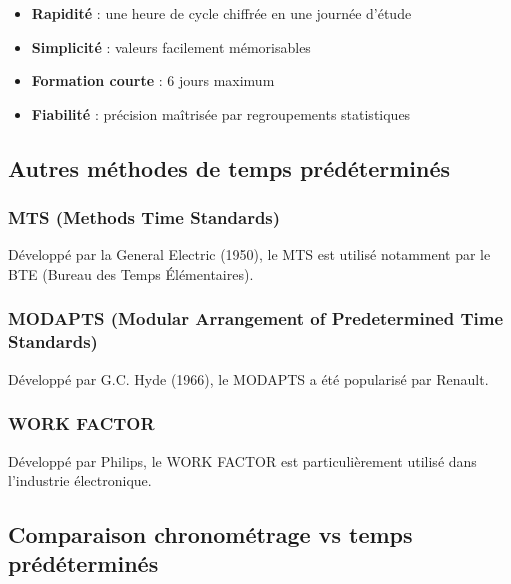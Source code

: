 \documentclass[a4paper,12pt]{article}
\begin{document}
\begin{itemize}
    \item \textbf{Rapidité} : une heure de cycle chiffrée en une journée d'étude
    \item \textbf{Simplicité} : valeurs facilement mémorisables
    \item \textbf{Formation courte} : 6 jours maximum
    \item \textbf{Fiabilité} : précision maîtrisée par regroupements statistiques
\end{itemize}

\subsection{Autres méthodes de temps prédéterminés}

\subsubsection{MTS (Methods Time Standards)}

Développé par la General Electric (1950), le MTS est utilisé notamment par le BTE (Bureau des Temps Élémentaires).

\subsubsection{MODAPTS (Modular Arrangement of Predetermined Time Standards)}

Développé par G.C. Hyde (1966), le MODAPTS a été popularisé par Renault.

\subsubsection{WORK FACTOR}

Développé par Philips, le WORK FACTOR est particulièrement utilisé dans l'industrie électronique.

\subsection{Comparaison chronométrage vs temps prédéterminés}
\end{document}
